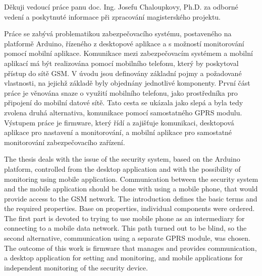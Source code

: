 \documentclass[FM,MP]{tulthesis}  %
\begin{document}

\begin{acknowledgement}
Děkuji vedoucí práce panu doc. Ing. Josefu Chaloupkovy, Ph.D. za odborné vedení a poskytnuté informace při zpracování magisterského projektu.
\end{acknowledgement}


\begin{abstractCZ}
Práce se zabývá problematikou zabezpečovacího systému, postaveného na platformě Arduino, řízeného z desktopové aplikace a s možností monitorování pomocí mobilní aplikace. Komunikace mezi zabezpečovacím systémem a mobilní aplikací má být realizována pomocí mobilního telefonu, který by poskytoval přístup do sítě GSM. V úvodu jsou definovány základní pojmy a požadované vlastnosti, na jejichž základě byly objednány jednotlivé komponenty. První část práce je věnována snaze o využití mobilního telefonu, jako prostředníka pro připojení do mobilní datové sítě. Tato cesta se ukázala jako slepá a byla tedy zvolena druhá alternativa, komunikace pomocí samostatného GPRS modulu. Výstupem práce je firmware, který řídí a zajišťuje komunikaci, desktopová aplikace pro nastavení a monitorování, a mobilní aplikace pro samostatné monitorování zabezpečovacího zařízení.

\end{abstractCZ}

\vspace{2cm}

\begin{abstractEN}
The thesis deals with the issue of the security system, based on the Arduino platform, controlled from the desktop application and with the possibility of monitoring using mobile application. Communication between the security system and the mobile application should be done with using a mobile phone, that would provide access to the GSM network. The introduction defines the basic terms and the required properties. Base on properties, individual components were ordered. The first part is devoted to trying to use mobile phone as an intermediary for connecting to a mobile data network. This path turned out to be blind, so the second alternative, communication using a separate GPRS module, was chosen. The outcome of this work is firmware that manages and provides communication, a desktop application for setting and monitoring, and mobile applications for independent monitoring of the security device.
\end{abstractEN}
\end{document}
